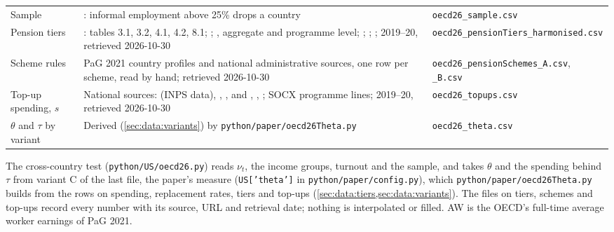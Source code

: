 \begin{table}[htbp]
\begin{spacing}{1.0}
\begin{tabular}{@{}>{\raggedright\arraybackslash}p{2.6cm}>{\raggedright\arraybackslash}p{\dimexpr\linewidth-6.2cm-4\tabcolsep\relax}>{\raggedright\arraybackslash}p{3.6cm}@{}}
Sample & \textcite{ILOSTAT}: informal employment above 25\% drops a country & \texttt{oecd26\_sample.csv} \\
Pension tiers & \textcite{OECD_PaG2021,OECD_PaG2025}: tables 3.1, 3.2, 4.1, 4.2, 8.1; \textcite[table 4.19]{OECD_PaG2013}; \textcite{OECD_SOCX}, aggregate and programme level; \textcite{Eurostat_ESSPROS}; \textcite{OECD_GPS}; \textcite{OECD_NATable29}; 2019--20, retrieved 2026-10-30 & \texttt{oecd26\_pensionTiers\_\allowbreak harmonised.csv} \\
Scheme rules & PaG 2021 country profiles and national administrative sources, one row per scheme, read by hand; retrieved 2026-10-30 & \texttt{oecd26\_pension\allowbreak Schemes\_A.csv}, \texttt{\_B.csv} \\
Top-up spending, $s$ & National sources: \textcite{ItinerariPrev2022} (INPS data), \textcite{DREES2025,DREES2022}, \textcite{BMF2022UG22}, \textcite{Bundestag2024} and \textcite{Destatis2021}, \textcite{Rekenhof2020}, \textcite{CFP2021}; SOCX programme lines; 2019--20, retrieved 2026-10-30 & \texttt{oecd26\_topups.csv} \\
$\theta$ and $\tau$ by variant & Derived (\cref{sec:data:variants}) by \texttt{python/paper/oecd26Theta.py} & \texttt{oecd26\_theta.csv} \\
\bottomrule
\end{tabular}
\end{spacing}
\end{table}

The cross-country test (\texttt{python/US/oecd26.py}) reads $\nu_t$, the income groups, turnout and the sample, and takes $\theta$ and the spending behind $\tau$ from variant C of the last file, the paper's measure (\texttt{US['theta']} in \texttt{python/paper/config.py}), which \texttt{python/paper/oecd26Theta.py} builds from the rows on spending, replacement rates, tiers and top-ups (\cref{sec:data:tiers,sec:data:variants}). The files on tiers, schemes and top-ups record every number with its source, URL and retrieval date; nothing is interpolated or filled. AW is the OECD's full-time average worker earnings of PaG 2021.
